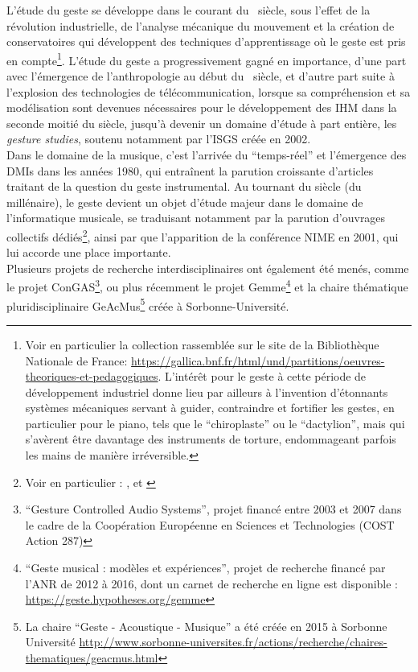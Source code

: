\indent L'étude du geste se développe dans le courant du ~siècle, sous l'effet de la révolution industrielle, de l'analyse mécanique du mouvement et la création de conservatoires qui développent des techniques d'apprentissage où le geste est pris en compte\footnote{Voir en particulier la collection rassemblée sur le site de la Bibliothèque Nationale de France: \url{https://gallica.bnf.fr/html/und/partitions/oeuvres-theoriques-et-pedagogiques}. L'intérêt pour le geste à cette période de développement industriel donne lieu par ailleurs à l'invention d'étonnants systèmes mécaniques servant à guider, contraindre et fortifier les gestes, en particulier pour le piano, tels que le ``chiroplaste'' ou le ``dactylion'', mais qui s'avèrent être davantage des instruments de torture, endommageant parfois les mains de manière irréversible.}. L'étude du geste a progressivement gagné en importance, d'une part avec l'émergence de l'anthropologie au début du ~siècle, et d'autre part suite à l'explosion des technologies de télécommunication, lorsque sa compréhension et sa modélisation sont devenues nécessaires pour le développement des \gls{IHM} dans la seconde moitié du siècle, jusqu'à devenir un domaine d'étude à part entière, les \textit{gesture studies}, soutenu notamment par l'\gls{ISGS} créée en 2002.\\
\indent Dans le domaine de la musique, c'est l'arrivée du ``temps-réel'' et l'émergence des \glspl{DMI} dans les années 1980, qui entraînent la parution croissante d'articles traitant de la question du geste instrumental. Au tournant du siècle (du millénaire), le geste devient un objet d'étude majeur dans le domaine de l'informatique musicale, se traduisant notamment par la parution d'ouvrages collectifs dédiés\footnote{Voir en particulier : \cite{genevois_les_1999}, \cite{wanderley_trends_2000} et \cite{godoy_musical_2010}}, ainsi par que l'apparition de la conférence \gls{NIME} en 2001, qui lui accorde une place importante.\\
\indent Plusieurs projets de recherche interdisciplinaires ont également été menés, comme le projet ConGAS\footnote{``Gesture Controlled Audio Systems'', projet financé entre 2003 et 2007 dans le cadre de la Coopération Européenne en Sciences et Technologies (COST Action 287)}, ou plus récemment le projet Gemme\footnote{``Geste musical : modèles et expériences'', projet de recherche financé par l'ANR de 2012 à 2016, dont un carnet de recherche en ligne est disponible : \url{https://geste.hypotheses.org/gemme}} et la chaire thématique pluridisciplinaire GeAcMus\footnote{La chaire ``Geste - Acoustique - Musique'' a été créée en 2015 à Sorbonne Université \url{http://www.sorbonne-universites.fr/actions/recherche/chaires-thematiques/geacmus.html}} créée à Sorbonne-Université.

